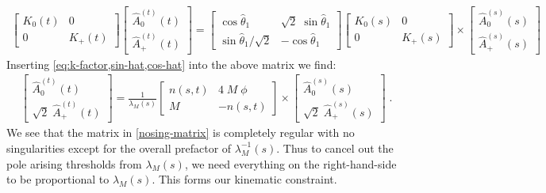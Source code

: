   \begin{align} \label{matrix-helicity}
    \begin{bmatrix}
        K_{0}(t)   & 0 \\
        0  &  K_{+}(t)
    \end{bmatrix}
    \begin{bmatrix}
      \hat{A}^{(t)}_{0}(t) \\
      \hat{A}^{(t)}_{+}(t)
    \end{bmatrix}
    =
    \begin{bmatrix}
      \cos \hat{\theta}_1  &  \sqrt{2} \; \sin \hat{\theta}_1   \\
       \sin \hat{\theta}_1 / \sqrt{2}  &  - \cos \hat{\theta}_1
    \end{bmatrix}
    \begin{bmatrix}
        K_{0}(s)   & 0 \\
        0  &  K_{+}(s)
    \end{bmatrix}
    \times
    \begin{bmatrix}
  \hat{A}^{(s)}_{0}(s) \\
  \hat{A}^{(s)}_{+}(s)
    \end{bmatrix}
  \end{align}
Inserting \cref{eq:k-factor,sin-hat,cos-hat} into the above matrix we find:
  \begin{align} \label{nosing-matrix}
    \begin{bmatrix}
  \hat{A}^{(t)}_{0}(t) \\
  \sqrt{2} \; \hat{A}^{(t)}_{+}(t)
    \end{bmatrix}
    =
    \frac{1}{\lambda_M(s)}
    \begin{bmatrix}
        n(s,t)   &  4 \; M \; \phi \\
        M  & - n(s,t)
    \end{bmatrix}
    \times
    \begin{bmatrix}
  \hat{A}^{(s)}_{0}(s) \\
  \sqrt{2} \;  \hat{A}^{(s)}_{+}(s)
    \end{bmatrix} \; .
  \end{align}
We see that the matrix in \cref{nosing-matrix} is completely regular with no singularities except for the overall prefactor of \(\lambda_M^{-1}(s)\). Thus to cancel out the pole arising thresholds from \(\lambda_M(s)\), we need everything on the right-hand-side to be proportional to \(\lambda_M(s)\). This forms our kinematic constraint.

